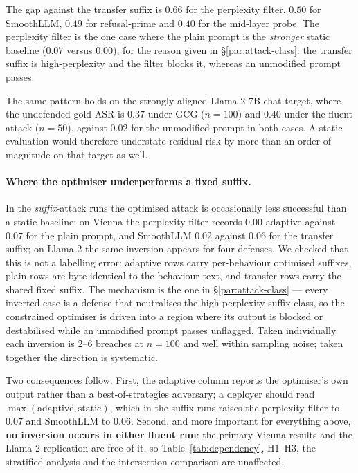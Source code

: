 The gap against the transfer suffix is $0.66$ for the perplexity filter, $0.50$ for
SmoothLLM, $0.49$ for refusal-prime and $0.40$ for the mid-layer probe. The perplexity filter
is the one case where the plain prompt is the \emph{stronger} static baseline ($0.07$ versus
$0.00$), for the reason given in \S\ref{par:attack-class}: the transfer suffix is
high-perplexity and the filter blocks it, whereas an unmodified prompt passes.

The same pattern holds on the strongly aligned Llama-2-7B-chat target, where the undefended
gold ASR is $0.37$ under GCG ($n=100$) and $0.40$ under the fluent attack ($n=50$), against
$0.02$ for the unmodified prompt in both cases. A static evaluation would therefore
understate residual risk by more than an order of magnitude on that target as well.

\paragraph{Where the optimiser underperforms a fixed suffix.}
\label{par:inversion}
In the \emph{suffix}-attack runs the optimised attack is occasionally less successful than a
static baseline: on Vicuna the perplexity filter records $0.00$ adaptive against $0.07$ for
the plain prompt, and SmoothLLM $0.02$ against $0.06$ for the transfer suffix; on Llama-2 the
same inversion appears for four defenses. We checked that this is not a labelling error:
adaptive rows carry per-behaviour optimised suffixes, plain rows are byte-identical to the
behaviour text, and transfer rows carry the shared fixed suffix. The mechanism is the one in
\S\ref{par:attack-class} --- every inverted case is a defense that neutralises the
high-perplexity suffix class, so the constrained optimiser is driven into a region where its
output is blocked or destabilised while an unmodified prompt passes unflagged. Taken
individually each inversion is $2$--$6$ breaches at $n=100$ and well within sampling noise;
taken together the direction is systematic.

Two consequences follow. First, the adaptive column reports the optimiser's own output rather
than a best-of-strategies adversary; a deployer should read
$\max(\text{adaptive},\text{static})$, which in the suffix runs raises the perplexity filter
to $0.07$ and SmoothLLM to $0.06$. Second, and more important for everything above,
\textbf{no inversion occurs in either fluent run}: the primary Vicuna results and the Llama-2
replication are free of it, so Table~\ref{tab:dependency}, H1--H3, the stratified analysis and
the intersection comparison are unaffected.

